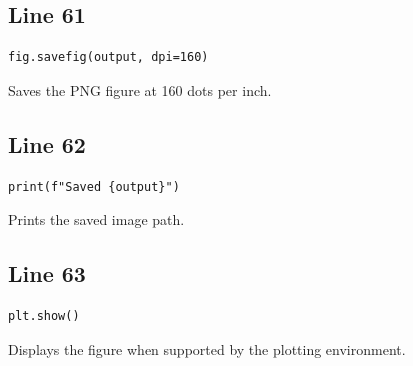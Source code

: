 \documentclass[11pt,a4paper]{article}
\begin{document}
\subsection*{Line 61}
\begin{lstlisting}
fig.savefig(output, dpi=160)
\end{lstlisting}
Saves the PNG figure at 160 dots per inch.

\subsection*{Line 62}
\begin{lstlisting}
print(f"Saved {output}")
\end{lstlisting}
Prints the saved image path.

\subsection*{Line 63}
\begin{lstlisting}
plt.show()
\end{lstlisting}
Displays the figure when supported by the plotting environment.
\end{document}
